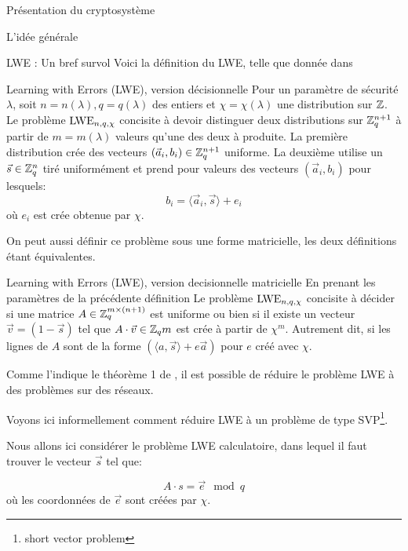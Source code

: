 \begin{section}{Présentation du cryptosystème}
	\begin{subsection}{L'idée générale}
	\end{subsection}
	\begin{subsection}{LWE : Un bref survol}
	Voici la définition du LWE, telle que donnée dans
	\cite{C:GenSahWat13} 

	\begin{definition}{Learning with Errors (LWE), version décisionnelle}
	Pour un paramètre de sécurité $\lambda$, soit $n = n(\lambda),q = q(\lambda)$ 
	des entiers et $\chi = \chi(\lambda)$ une
	distribution sur $\mathbb{Z}$.
	Le problème $\text{LWE}_{n,q,\chi}$ concisite à devoir distinguer 
	deux distributions sur $\mathbb{Z}_q^{n+1}$ à partir 
	de $m = m(\lambda)$ valeurs qu'une des deux à produite.
	La première distribution crée des vecteurs $(\vec{a}_i,b_i) \in
	\mathbb{Z}_q^{n+1}$ uniforme.
	La deuxième utilise un $\vec{s} \in \mathbb{Z}_q^n$ tiré uniformément et 
	prend pour valeurs des vecteurs $(\vec{a}_i, b_i)$ pour lesquels:
		\[ b_i = \langle \vec{a}_i, \vec{s} \rangle + e_i \]
	où $e_i$ est crée obtenue par $\chi$.
	\end{definition}


	On peut aussi définir ce problème sous une forme matricielle, les 
	deux définitions étant équivalentes.

	\begin{definition}{Learning with Errors (LWE), version decisionnelle matricielle}
	En prenant les paramètres de la précédente définition
	Le problème $\text{LWE}_{n,q,\chi}$ concisite à décider 
	si une matrice $A \in \mathbb{Z}_q^{m \times (n+1)}$ 
	est uniforme ou bien si il existe un vecteur $\vec{v} = (1
	-\vec{s})$ tel que $A \cdot \vec{v} \in \mathbb{Z}_q{m}$ est 
	crée à partir de $\chi^m$. Autrement dit, si les lignes 
	de $A$ sont de la forme $(\langle a, \vec{s} \rangle + e \vec{a})$ 
	pour $e$ créé avec $\chi$.
	\end{definition}

	Comme l'indique le théorème 1 de \cite{C:GenSahWat13}, il est
	possible de réduire le problème LWE à des problèmes sur des réseaux.

	Voyons ici informellement comment réduire LWE à un problème de type 
	SVP\footnote{short vector problem}. 

	Nous allons ici considérer le problème LWE calculatoire, dans lequel il
	faut trouver le vecteur $\vec{s}$ tel que:

	\[ A\cdot s = \vec{e} \mod q \]
	où les coordonnées de $\vec{e}$ sont créées par $\chi$.


\end{subsection}
\end{section}
